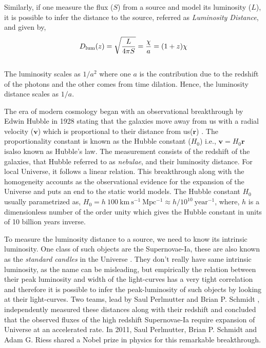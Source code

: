 Similarly, if one measure the flux ($S$) from a source and model its luminosity ($L$), it is
possible to infer the distance to the source, referred as {\it Luminosity Distance}, and 
given by,
\begin{equation}
	D_{\rm lum}(z) = \sqrt{\dfrac{L}{4\pi S}} = \dfrac{\chi}{a} = (1+z)\chi
\end{equation}
\\
The luminosity scales as $1/a^2$ where one $a$ is the contribution due to the redshift of
the photons and the other comes from time dilation. Hence, the luminosity distance scales
as $1/a$.

The era of modern cosmology began with an observational breakthrough by Edwin Hubble 
in 1928 stating that the galaxies move away from us with a radial velocity ($\mathbf{v}$) which
is proportional to their distance from us($\mathbf{r}$) \citep{1929PNAS...15..168H}. 
The proportionality constant is known
as the Hubble constant ($H_0$) i.e., $\mathbf{v}=H_0 \mathbf{r}$ isalso known as Hubble's law. 
The measurement consists of the redshift of the galaxies, that Hubble referred to as
{\it nebulae}, and their luminosity distance. For local Universe, it follows
a linear relation. 
This breakthrough along with the
homogeneity accounts as the observational evidence for the expansion of the Universe and
puts an end to the static world models. The Hubble constant $H_0$ usually parametrized as, 
$H_0 = h\ 100\ \mathrm{km\ s^{-1}\ Mpc^{-1}} \approx h/10^{10}\ \mathrm{year^{-1}}$,
where, $h$ is a dimensionless number of the order unity which gives the 
Hubble constant in units of 10 billion years inverse. 

To measure the luminosity distance to a source, we need to 
know its intrinsic luminosity. One class of such objects are the Supernovae-Ia, these are also known as the {\it standard candles} in the Universe
\citep{1993ApJ...405L...5B,2007AIPC..924..330D}. They
don't really have same intrinsic luminosity, as the name can be misleading, but 
empirically the relation between their peak luminosity and width of the light-curves
has a very tight correlation and therefore it is possible to infer the peak-luminosity
of such objects by looking at their light-curves. Two teams, lead by Saul Perlmutter
\citep{1999ApJ...517..565P} and
Brian P. Schmidt \citep{1998ApJ...507...46S}, 
independently measured these distances along with their redshift and
concluded that the observed fluxes of the high redshift Supernovae-Ia require expansion of Universe at an accelerated rate. In 2011, Saul Perlmutter, 
Brian P. Schmidt and Adam G. Riess
shared a Nobel prize in physics for this remarkable breakthrough. 




